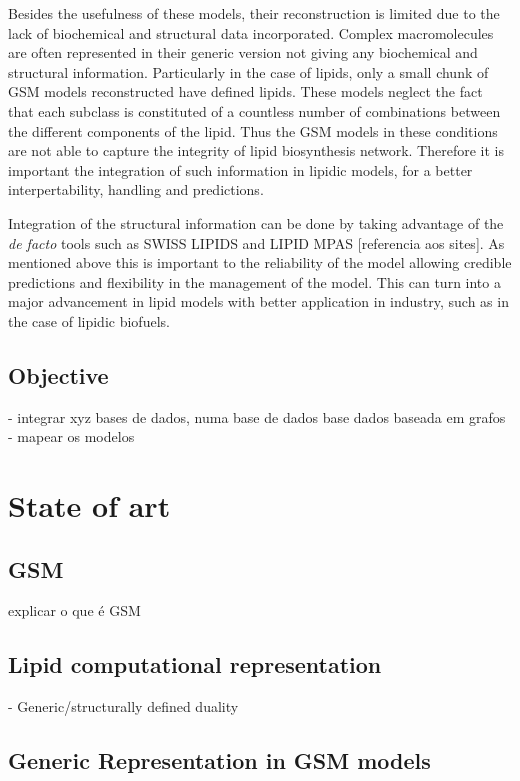 \documentclass{llncs}
\begin{document}
Besides the usefulness of these models, their reconstruction is limited due to the lack of biochemical and structural data incorporated.
Complex macromolecules are often represented in their generic version not giving any biochemical and structural information.
Particularly in the case of lipids, only a small chunk of GSM models reconstructed have defined lipids. 
These models neglect the fact that each subclass is constituted of a countless number of combinations between the different components of the lipid. 
Thus the GSM models in these conditions are not able to capture the integrity of lipid biosynthesis network.
Therefore it is important the integration of such information in lipidic models, for a better interpertability, handling and predictions.

Integration of the structural information can be done by taking advantage of the  \emph{de facto} tools such as SWISS LIPIDS and  LIPID MPAS [referencia aos sites].
As mentioned above this is important to the reliability of the model allowing credible predictions and flexibility in the management of the model.
This can turn into a major advancement in lipid models with better application in industry, such as in the case of lipidic biofuels.




\subsection{Objective}
- integrar xyz bases de dados, numa base de dados base dados baseada
em grafos
- mapear os modelos 
\section{State of art}
\subsection{GSM}
explicar o que é GSM

\subsection{Lipid computational representation}

- Generic/structurally defined duality

\subsection{Generic Representation in GSM models}
\end{document}
